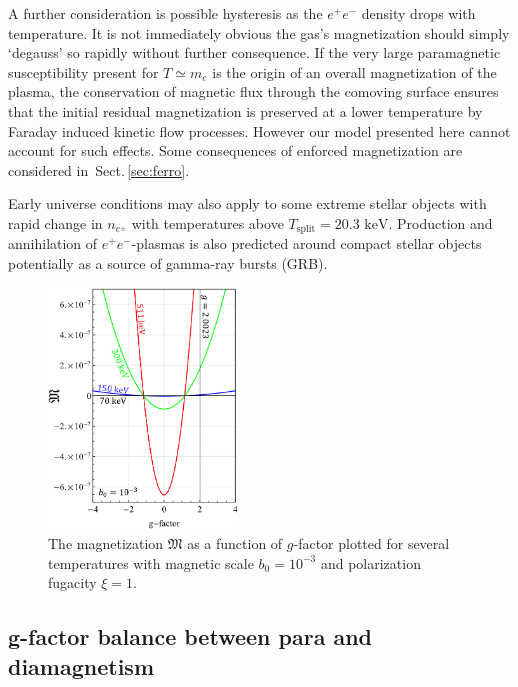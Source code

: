 \documentclass[aps,prd,floatfix,reprint]{revtex4-2}
\newcommand*{\keV}{\text{ keV}}
\newcommand{\rsec}[1]{Sect.\,{\ref{#1}}}
\begin{document}
A further consideration is possible hysteresis as the $e^{+}e^{-}$ density drops with temperature. It is not immediately obvious the gas's magnetization should simply `degauss' so rapidly without further consequence. If the very large paramagnetic susceptibility present for $T\simeq m_{e}$ is the origin of an overall magnetization of the plasma, the conservation of magnetic flux through the comoving surface ensures that the initial residual magnetization is preserved at a lower temperature by Faraday induced kinetic flow processes. However our model presented here cannot account for such effects. Some consequences of enforced magnetization are considered in~\rsec{sec:ferro}.

Early universe conditions may also apply to some extreme stellar objects with rapid change in $n_{e^{\pm}}$ with temperatures above $T_\mathrm{split}=20.3\keV$. Production and annihilation of $e^{+}e^{-}$-plasmas is also predicted around compact stellar objects~\cite{Ruffini:2009hg,Ruffini:2012it} potentially as a source of gamma-ray bursts (GRB).

\begin{figure}[ht]
 \centering
 \includegraphics[width=0.45\textwidth]{plots/GFactor_05.png}
 \caption{The magnetization $\mathfrak M$ as a function of $g$-factor plotted for several temperatures with magnetic scale $b_{0}=10^{-3}$ and polarization fugacity $\xi=1$.}
 \label{fig:gfac} 
\end{figure}

\subsection{g-factor balance between para and diamagnetism}
\label{sec:gfac}
\end{document}
